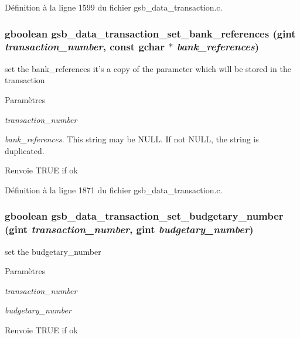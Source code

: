 Définition à la ligne 1599 du fichier gsb\_\-data\_\-transaction.c.

\subsubsection[{gsb\_\-data\_\-transaction\_\-set\_\-bank\_\-references}]{\setlength{\rightskip}{0pt plus 5cm}gboolean gsb\_\-data\_\-transaction\_\-set\_\-bank\_\-references (gint {\em transaction\_\-number}, \/  const gchar $\ast$ {\em bank\_\-references})}\label{gsb__data__transaction_8h_a4e91601dcc725a5ff6a109e4d1dad915}
set the bank\_\-references it's a copy of the parameter which will be stored in the transaction


\begin{DoxyParams}{Paramètres}
\item[{\em transaction\_\-number}]\item[{\em bank\_\-references.}]This string may be NULL. If not NULL, the string is duplicated.\end{DoxyParams}
\begin{DoxyReturn}{Renvoie}
TRUE if ok 
\end{DoxyReturn}


Définition à la ligne 1871 du fichier gsb\_\-data\_\-transaction.c.

\subsubsection[{gsb\_\-data\_\-transaction\_\-set\_\-budgetary\_\-number}]{\setlength{\rightskip}{0pt plus 5cm}gboolean gsb\_\-data\_\-transaction\_\-set\_\-budgetary\_\-number (gint {\em transaction\_\-number}, \/  gint {\em budgetary\_\-number})}\label{gsb__data__transaction_8h_a5cdc1a654e5dbb278af9ad23828fe82d}
set the budgetary\_\-number 
\begin{DoxyParams}{Paramètres}
\item[{\em transaction\_\-number}]\item[{\em budgetary\_\-number}]\end{DoxyParams}
\begin{DoxyReturn}{Renvoie}
TRUE if ok 
\end{DoxyReturn}


